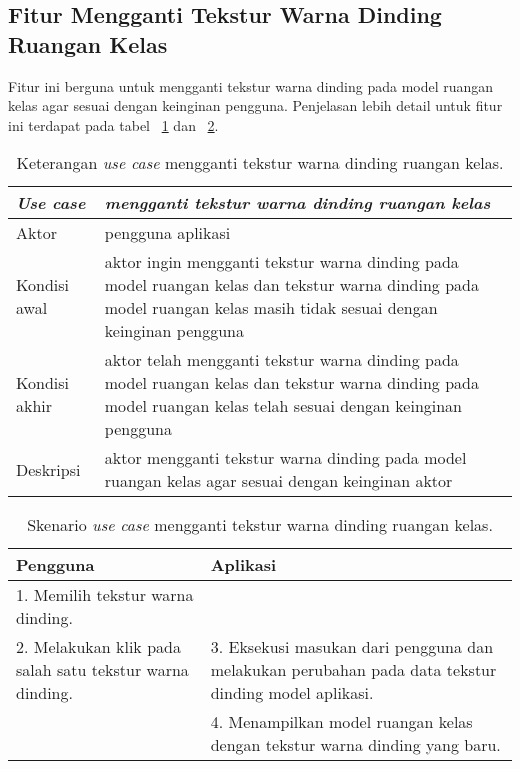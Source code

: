 \subsection{Fitur Mengganti Tekstur Warna Dinding Ruangan Kelas}
Fitur ini berguna untuk mengganti tekstur warna dinding pada model ruangan kelas agar sesuai dengan keinginan pengguna. Penjelasan lebih detail untuk fitur ini terdapat pada tabel ~\ref{table:fiturgantiteksturdinding1} dan ~\ref{table:fiturgantiteksturdinding2}.
\begin{table}[H]
	\centering
	\begin{tabular}{| m{10em} | m{30em} |} 
	\hline
	\textbf{\textit{Use case}} & \textbf{\textit{mengganti tekstur warna dinding ruangan kelas}} \\ 
	\hline
	Aktor & pengguna aplikasi  \\ 
	\hline
	Kondisi awal & aktor ingin mengganti tekstur warna dinding pada model ruangan kelas dan tekstur warna dinding pada model ruangan kelas masih tidak sesuai dengan keinginan pengguna \\ 
	\hline
	Kondisi akhir & aktor telah mengganti tekstur warna dinding pada model ruangan kelas dan tekstur warna dinding pada model ruangan kelas telah sesuai dengan keinginan pengguna \\ 
 	\hline
	Deskripsi & aktor mengganti tekstur warna dinding pada model ruangan kelas agar sesuai dengan keinginan aktor \\ 
 	\hline
	\end{tabular}
	\caption{Keterangan {\it use case} mengganti tekstur warna dinding ruangan kelas.}
	\label{table:fiturgantiteksturdinding1}
\end{table}

\begin{table}[H]
	\centering
	\begin{tabular}{| m{20em} | m{20em} |} 
	\hline
	\textbf{Pengguna} & \textbf{Aplikasi} \\ 
	\hline
	1. Memilih tekstur warna dinding. &  \\ 
	\hline
	2. Melakukan klik pada salah satu tekstur warna dinding. & 3. Eksekusi masukan dari pengguna dan melakukan perubahan pada data tekstur dinding model aplikasi. \\ 
	\hline
	 & 4. Menampilkan model ruangan kelas dengan tekstur warna dinding yang baru. \\ 
 	\hline
	\end{tabular}
	\caption{Skenario {\it use case} mengganti tekstur warna dinding ruangan kelas.}
	\label{table:fiturgantiteksturdinding2}
\end{table}

